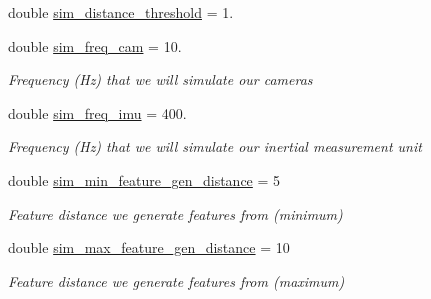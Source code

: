 \begin{DoxyCompactItemize}
double \hyperlink{structov__init_1_1InertialInitializerOptions_aa21a87a289051ef5ae66b315a53de75e}{sim\+\_\+distance\+\_\+threshold} = 1.
\item 
\mbox{\label{structov__init_1_1InertialInitializerOptions_aad85b7e3154b976099a927066259e19b}} 
double \hyperlink{structov__init_1_1InertialInitializerOptions_aad85b7e3154b976099a927066259e19b}{sim\+\_\+freq\+\_\+cam} = 10.
\begin{DoxyCompactList}\small\item\em Frequency (Hz) that we will simulate our cameras \end{DoxyCompactList}\item 
\mbox{\label{structov__init_1_1InertialInitializerOptions_ad5469977d726e6281781746dbf527c1e}} 
double \hyperlink{structov__init_1_1InertialInitializerOptions_ad5469977d726e6281781746dbf527c1e}{sim\+\_\+freq\+\_\+imu} = 400.
\begin{DoxyCompactList}\small\item\em Frequency (Hz) that we will simulate our inertial measurement unit \end{DoxyCompactList}\item 
\mbox{\label{structov__init_1_1InertialInitializerOptions_a5dcebf9e0a5f13dde042ba43db83cf37}} 
double \hyperlink{structov__init_1_1InertialInitializerOptions_a5dcebf9e0a5f13dde042ba43db83cf37}{sim\+\_\+min\+\_\+feature\+\_\+gen\+\_\+distance} = 5
\begin{DoxyCompactList}\small\item\em Feature distance we generate features from (minimum) \end{DoxyCompactList}\item 
\mbox{\label{structov__init_1_1InertialInitializerOptions_a0408c41382b9a69d976e27e977884765}} 
double \hyperlink{structov__init_1_1InertialInitializerOptions_a0408c41382b9a69d976e27e977884765}{sim\+\_\+max\+\_\+feature\+\_\+gen\+\_\+distance} = 10
\begin{DoxyCompactList}\small\item\em Feature distance we generate features from (maximum) \end{DoxyCompactList}\end{DoxyCompactItemize}


